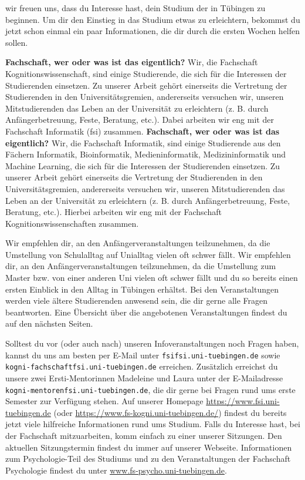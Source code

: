 wir freuen uns, dass du Interesse hast, dein Studium der \studiengang in Tübingen zu beginnen.
Um dir den Einstieg in das Studium etwas zu erleichtern, bekommst du jetzt schon einmal
ein paar Informationen, die dir durch die ersten Wochen helfen sollen.


\ifkogwiss
\textbf{\glqq Fachschaft\grqq, wer oder was ist das eigentlich?} Wir, die Fachschaft Kognitionswissenschaft, sind einige Studierende, die sich für die Interessen der Studierenden einsetzen. Zu unserer Arbeit
gehört einerseits die Vertretung der Studierenden in den Universitätsgremien, andererseits versuchen wir, unseren
Mitstudierenden das Leben an der Universität zu erleichtern (z. B. durch Anfängerbetreuung, Feste,
Beratung, etc.). Dabei arbeiten wir eng mit der Fachschaft Informatik (fsi) zusammen.
\else
\textbf{\glqq Fachschaft\grqq, wer oder was ist das eigentlich?} Wir, die Fachschaft Informatik, sind einige Studierende aus den Fächern
Informatik, Bioinformatik, Medieninformatik, Medizininformatik und Machine Learning, die sich für die Interessen der Studierenden einsetzen. Zu unserer Arbeit
gehört einerseits die Vertretung der Studierenden in den Universitätsgremien, andererseits versuchen wir, unseren
Mitstudierenden das Leben an der Universität zu erleichtern (z. B. durch Anfängerbetreuung, Feste, Beratung, etc.). Hierbei arbeiten wir eng mit der Fachschaft Kognitionswissenschaften zusammen.
\fi

\ifbachelor
Wir empfehlen dir, an den Anfängerveranstaltungen teilzunehmen, da die Umstellung von Schulalltag
auf Unialltag vielen oft schwer fällt.
\fi
\ifmaster
Wir empfehlen dir, an den Anfängerveranstaltungen teilzunehmen, da die Umstellung zum Master bzw. von einer anderen Uni vielen oft schwer fällt und du so bereits einen ersten Einblick in den Alltag in Tübingen erhältst.
\fi
Bei den Veranstaltungen werden viele ältere Studierenden
anwesend sein, die dir gerne alle Fragen beantworten. Eine Übersicht über die angebotenen
Veranstaltungen findest du auf den nächsten Seiten.

Solltest du vor (oder auch nach) unseren Infoveranstaltungen noch Fragen haben, kannst du uns
am besten per E-Mail unter \texttt{fsi\At fsi.uni-tuebingen.de}
\ifkogwiss
sowie \texttt{kogni-fachschaft\At fsi.uni-tuebingen.de}
\fi
erreichen.
\ifkogwiss
Zusätzlich erreichst du unsere zwei Ersti-Mentorinnen Madeleine und Laura unter der E-Mailadresse \texttt{kogni-mentoren\At fsi.uni-tuebingen.de}, die dir gerne bei Fragen rund ums erste Semester zur Verfügung stehen.
\fi
Auf unserer Homepage
\url{https://www.fsi.uni-tuebingen.de} (oder \url{https://www.fs-kogni.uni-tuebingen.de/}) findest du bereits jetzt viele hilfreiche Informationen rund
ums Studium. Falls du Interesse hast, bei der Fachschaft mitzuarbeiten, komm einfach zu einer unserer Sitzungen. Den aktuellen Sitzungstermin findest du immer auf unserer Webseite.
\ifkogwiss  Informationen zum Psychologie-Teil des Studiums und zu den Veranstaltungen der
Fachschaft Psychologie findest du unter \url{www.fs-psycho.uni-tuebingen.de}.\fi

